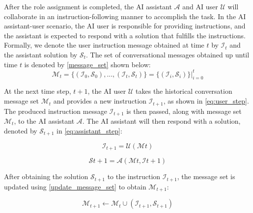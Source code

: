 After the role assignment is completed, the AI assistant $\mathcal{A}$ and AI user $\mathcal{U}$ will collaborate in an instruction-following manner to accomplish the task. In the AI assistant-user scenario, the AI user is responsible for providing instructions, and the assistant is expected to respond with a solution that fulfills the instructions. Formally, we denote the user instruction message obtained at time $t$ by $\mathcal{I}_t$ and the assistant solution by $\mathcal{S}_t$. The set of conversational messages obtained up until time $t$ is denoted by \eqnLabel \eqref{message_set} shown below:
\begin{equation} \label{message_set}
    \mathcal{M}_t  = \{(\mathcal{I}_0, \mathcal{S}_0),...,(\mathcal{I}_t, \mathcal{S}_t)\} = \{(\mathcal{I}_i, \mathcal{S}_i)\}|_{i=0}^{t}
\end{equation}

At the next time step, $t+1$, the AI user $\mathcal{U}$ takes the historical conversation message set $\mathcal{M}_t$ and provides a new instruction $\mathcal{I}_{t+1}$, as shown in \eqnLabel \eqref{eq:user_step}. The produced instruction message $\mathcal{I}_{t+1}$ is then passed, along with message set $\mathcal{M}_t$, to the AI assistant $\mathcal{A}$. The AI assistant will then respond with a solution, denoted by $\mathcal{S}_{t+1}$ in \eqnLabel \eqref{eq:assistant_step}:

\begin{minipage}{0.5\textwidth}
\begin{equation} \label{eq:user_step}
\mathcal{I}_{t+1} = \mathcal{U}(\mathcal{M}t)
\end{equation}
\end{minipage}
\hfill
\begin{minipage}{0.5\textwidth}
\begin{equation} \label{eq:assistant_step}
\mathcal{S}{t+1} = \mathcal{A}(\mathcal{M}t, \mathcal{I}{t+1})
\end{equation}
\end{minipage}


After obtaining the solution $\mathcal{S}_{t+1}$ to the instruction $\mathcal{I}_{t+1}$, the message set is updated using \eqnLabel \eqref{update_message_set} to obtain $\mathcal{M}_{t+1}$:

\begin{equation}\label{update_message_set}
    \mathcal{M}_{t+1}  \leftarrow \mathcal{M}_t \cup (\mathcal{I}_{t+1}, \mathcal{S}_{t+1})
\end{equation}

